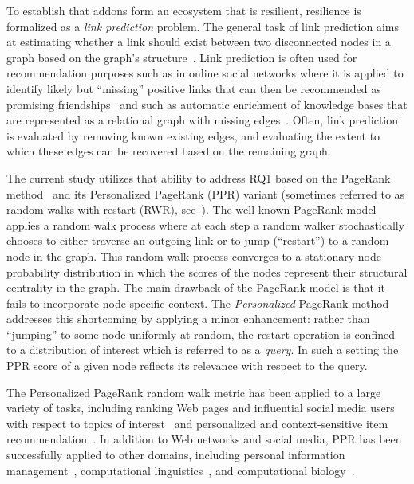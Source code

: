 \documentclass[10pt,letterpaper]{article}
\begin{document}
To establish that addons form an ecosystem that is resilient, resilience is formalized as a \textit{link prediction} problem. The general task of link prediction aims at estimating whether a link should exist between two disconnected nodes in a graph based on the graph's structure~\cite{henzinger2000link,getoor2005link,lu2011link,sunWSDM12}. Link prediction is often used for recommendation purposes such as in online social networks where it is applied to identify likely but ``missing'' positive links that can then be recommended as promising friendships~\cite{leskovec2010predicting} and such as automatic enrichment of knowledge bases that are represented as a relational graph with missing edges~\cite{lao2010relational}. Often, link prediction is evaluated by removing known existing edges, and evaluating the extent to which these edges can be recovered based on the remaining graph. 

The current study utilizes that ability to address RQ1 based on the PageRank method~\cite{page1999pagerank,franceschet2011pagerank} and its Personalized PageRank (PPR) variant (sometimes referred to as random walks with restart (RWR), see~\cite{tongKAIS08}). The well-known PageRank model applies a random walk process where at each step a random walker stochastically chooses to either traverse an outgoing link or to jump (``restart'') to a random node in the graph. This random walk process converges to a stationary node probability distribution in which the scores of the nodes represent their structural centrality in the graph. The main drawback of the PageRank model is that it fails to incorporate node-specific context. The \textit{Personalized} PageRank method addresses this shortcoming by applying a minor enhancement: rather than ``jumping'' to some node uniformly at random, the restart operation is confined to a distribution of interest which is referred to as a \textit{query}. In such a setting the PPR score of a given node reflects its relevance with respect to the query.

The Personalized PageRank random walk metric has been applied to a large variety of tasks, including ranking Web pages and influential social media users with respect to topics of interest~\cite{haveliwala2002topic,weng2010twitterrank} and personalized and context-sensitive item recommendation~\cite{lee2011random}. In addition to Web networks and social media, PPR has been successfully applied to other domains, including personal information management~\cite{minkov2010improving}, computational linguistics~\cite{agirreEACL09}, and computational biology~\cite{freschi2007protein}.
\end{document}
